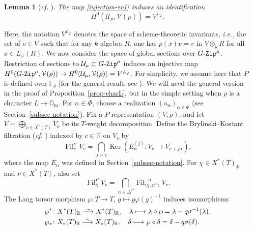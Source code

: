 \documentclass[11pt]{amsart}
\numberwithin{equation}{section}
\newtheorem{lemma}[theorem]{Lemma}
\theoremstyle{definition}
\theoremstyle{remark}
\newcommand{\GZip}{\mathop{\text{$G$-{\tt Zip}}}\nolimits}
\newcommand{\Ucal}{{\mathcal U}}
\newcommand{\Vcal}{{\mathcal V}}
\newcommand{\FF}{\mathbb{F}}
\newcommand{\GG}{\mathbb{G}}
\newcommand{\RR}{\mathbb{R}}
\DeclareMathOperator{\Ker}{Ker}
\newcommand{\cf}{{\em cf. }}
\DeclareMathOperator{\fil}{Fil}
\def\lowsim{\vbox to 0pt{\vss\hbox{$\scriptstyle\sim$}\vskip-1.6pt}}
\begin{document}
\begin{lemma}[\textit{cf.} {\cite[Corollary 3.2.3]{Imai-Koskivirta-vector-bundles}}] \label{lem-Umu-sections}
The map \eqref{injection-ev1} induces an identification
\begin{equation}
 H^0\left(\Ucal_\mu,\Vcal(\rho)\right)=V^{L_\varphi}.   
\end{equation}
\end{lemma}

Here, the notation $V^{L_{\varphi}}$ denotes the space of scheme-theoretic invariants, \textit{i.e.}, the set of $v\in V$ such that for any $k$-algebra $R$, one has $\rho(x)v=v$ in $V\otimes_k R$ for all $x\in L_{\varphi}(R)$. We now consider the space of global sections over $\GZip^\mu$. Restriction of sections to $\Ucal_\mu\subset \GZip^\mu$ induces an injective map $H^0(\GZip^{\mu},\Vcal(\rho))\to H^0(\Ucal_\mu,\Vcal(\rho))=V^{L_\varphi}$. For simplicity, we assume here that $P$ is defined over $\FF_q$ (for the general result, see \cite[Theorem 3.4.1]{Imai-Koskivirta-vector-bundles}). We will need the general version in the proof of Proposition~\ref{prop-charL}, but in the simple setting when $\rho$ is a character $L\to \GG_{\mathrm{m}}$. For $\alpha\in \Phi$, choose a realization $(u_{\alpha})_{\alpha \in \Phi}$ (see Section~\ref{subsec-notation}). Fix a $P$-representation $(V,\rho)$, and let $V=\bigoplus_{\nu \in X^*(T)} V_\nu$ be its $T$-weight decomposition. Define the Brylinski--Kostant filtration (\cf \cite[Equation~(3.3.2)]{Xiao-Zhu-on-vector-valued}) indexed by $c\in \RR$ on $V_\nu$ by 
\begin{equation}\label{equ-Filc}
\fil_{c}^{\alpha} V_{\nu} = 
 \bigcap_{j > c} \Ker \left( 
 E_{\alpha}^{(j)} \colon V_{\nu} \to V_{\nu+j\alpha} \right), 
\end{equation}
where the map $E_{\alpha}$ was defined in Section~\ref{subsec-notation}. For $\chi \in X^*(T)_{\RR}$ and $\nu \in X^*(T)$, also set
\begin{equation}\label{equ-FilPchi}
 \fil_{\chi}^P 
 V_{\nu} = 
 \bigcap_{\alpha \in \Delta^P} 
 \fil_{\langle \chi, \alpha^\vee \rangle}^{-\alpha} 
 V_{\nu}.
\end{equation}
The Lang torsor morphism $\wp \colon T \to T$, $g\mapsto g\varphi(g)^{-1}$ induces isomorphisms 
\begin{align}
 &\wp^* \colon X^*(T)_{\RR} \stackrel{\lowsim}{\longrightarrow} X^*(T)_{\RR},\quad \lambda \longmapsto \lambda \circ \wp  = \lambda -q\sigma^{-1}(\lambda), \label{equ-Pupstar} \\
 &\wp_* \colon X_*(T)_{\RR} \stackrel{\lowsim}{\longrightarrow} X_*(T)_{\RR},\quad \delta \longmapsto \wp \circ \delta  = \delta -q\sigma(\delta).  \label{equ-Plowstar}
\end{align}
\end{document}
